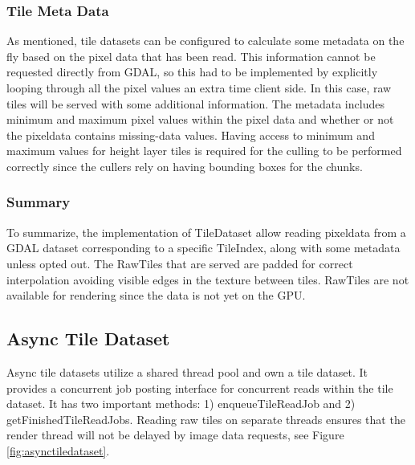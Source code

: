 \subsubsection{Tile Meta Data}
As mentioned, tile datasets can be configured to calculate some metadata on the fly based on the pixel data that has been read. This information cannot be requested directly from GDAL, so this had to be implemented by explicitly looping through all the pixel values an extra time client side. In this case, raw tiles will be served with some additional information. The metadata includes minimum and maximum pixel values within the pixel data and whether or not the pixeldata contains missing-data values. Having access to minimum and maximum values for height layer tiles is required for the culling to be performed correctly since the cullers rely on having bounding boxes for the chunks.

\subsubsection{Summary}
To summarize, the implementation of TileDataset allow reading pixeldata from a GDAL dataset corresponding to a specific TileIndex, along with some metadata unless opted out. The RawTiles that are served are padded for correct interpolation avoiding visible edges in the texture between tiles. RawTiles are not available for rendering since the data is not yet on the GPU.

\subsection{Async Tile Dataset}
Async tile datasets utilize a shared thread pool and own a tile dataset. It provides a concurrent job posting interface for concurrent reads within the tile dataset. It has two important methods: 1) enqueueTileReadJob and 2) getFinishedTileReadJobs. Reading raw tiles on separate threads ensures that the render thread will not be delayed by image data requests, see Figure \ref{fig:asynctiledataset}.

